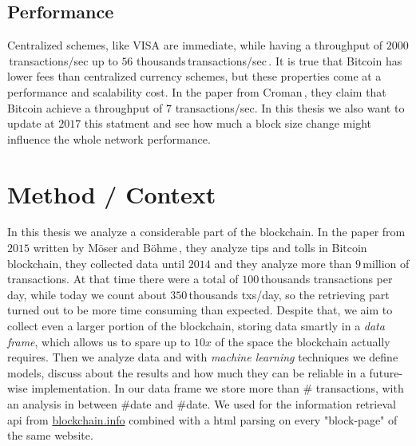 \documentclass[USenglish]{uit-thesis}
\begin{document}
\subsection{Performance}
Centralized schemes, like VISA are immediate, while having a
throughput of $2000$\,transactions/sec
up to $56$ thousands\,transactions/sec\,\cite{croman2016}.
It is true that Bitcoin has lower fees than centralized
currency schemes, but these properties
come at a performance and scalability cost.
In the paper from Croman\,\cite{croman2016}, they
claim that Bitcoin achieve a throughput of $7$ transactions/sec.
In this thesis we also want to update at $2017$ this statment
and see how much a block size change might
influence the whole network performance.




\section{Method / Context}
\label{sec:method}
In this thesis we analyze a considerable part of the blockchain.
In the paper from $2015$ written by Möser and Böhme\,\cite{Moser2015},
they analyze tips and tolls in Bitcoin blockchain, they collected data until $2014$
and they analyze more than $9$\,million of transactions.
At that time there were a total of $100$\,thousands
transactions per day, while today we count about $350$\,thousands
txs/day, so the retrieving part turned out to be more time consuming than expected.
Despite that, we aim to collect even
a larger portion of the blockchain, storing data smartly in a
\emph{data frame}, which allows us to spare
up to $10x$ of the space the blockchain actually requires. Then we analyze data
and with \emph{machine learning} techniques we define models, discuss about
the results and how much they can be reliable in a future-wise implementation.
In our data frame we store more than \# transactions, with an analysis in between
\#date and \#date.
We used for the information retrieval \gls{api} from \url{blockchain.info}
combined with a \gls{html} parsing on every "block-page"
of the same website.
\end{document}
